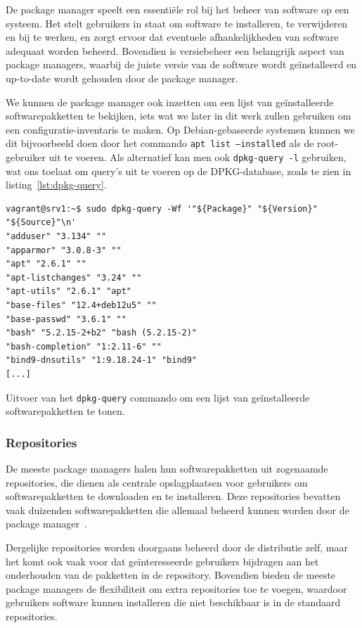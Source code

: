 De package manager speelt een essenti\"ele rol bij het beheer van software op een systeem.
Het stelt gebruikers in staat om software te installeren, te verwijderen en bij te werken, en zorgt ervoor dat eventuele afhankelijkheden van software adequaat worden beheerd.
Bovendien is versiebeheer een belangrijk aspect van package managers, waarbij de juiste versie van de software wordt ge\"installeerd en up-to-date wordt gehouden door de package manager.

We kunnen de package manager ook inzetten om een lijst van ge\"installeerde softwarepakketten te bekijken, iets wat we later in dit werk zullen gebruiken om een configuratie-inventaris te maken.
Op Debian-gebaseerde systemen kunnen we dit bijvoorbeeld doen door het commando \texttt{apt list --installed} als de root-gebruiker uit te voeren.
Als alternatief kan men ook \texttt{dpkg-query -l} gebruiken, wat ons toelaat om query's uit te voeren op de DPKG-database, zoals te zien in listing~\ref{lst:dpkg-query}.

\begin{listing}
  \begin{verbatim}
vagrant@srv1:~$ sudo dpkg-query -Wf '"${Package}" "${Version}" "${Source}"\n'
"adduser" "3.134" ""
"apparmor" "3.0.8-3" ""
"apt" "2.6.1" ""
"apt-listchanges" "3.24" ""
"apt-utils" "2.6.1" "apt"
"base-files" "12.4+deb12u5" ""
"base-passwd" "3.6.1" ""
"bash" "5.2.15-2+b2" "bash (5.2.15-2)"
"bash-completion" "1:2.11-6" ""
"bind9-dnsutils" "1:9.18.24-1" "bind9"
[...]
  \end{verbatim}
    \caption[Lijst van ge\"{i}nstalleerde softwarepakketten.]{Uitvoer van het \texttt{dpkg-query} commando om een lijst van ge\"installeerde softwarepakketten te tonen.}
  \label{lst:dpkg-query}
\end{listing}

\subsubsection{Repositories}
\label{linux_repositories}

De meeste package managers halen hun softwarepakketten uit zogenaamde repositories, die dienen als centrale opslagplaatsen voor gebruikers om softwarepakketten te downloaden en te installeren.
Deze repositories bevatten vaak duizenden softwarepakketten die allemaal beheerd kunnen worden door de package manager~\autocite{shotts2019linux}.

Dergelijke repositories worden doorgaans beheerd door de distributie zelf, maar het komt ook vaak voor dat ge\"interesseerde gebruikers bijdragen aan het onderhouden van de pakketten in de repository.
Bovendien bieden de meeste package managers de flexibiliteit om extra repositories toe te voegen, waardoor gebruikers software kunnen installeren die niet beschikbaar is in de standaard repositories.

